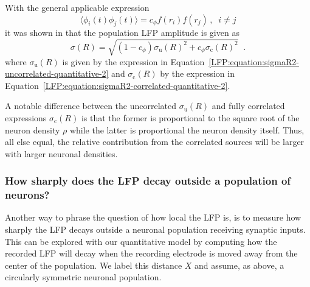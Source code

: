 With the general applicable expression
\begin{equation}
\langle \phi_i(t) \phi_j(t) \rangle= c_\phi f(r_i) f(r_j)\, , \;\; i \neq j
\label{LFP:box:equation:phii-phij}
\end{equation}
it was shown in \citet{Linden2011} that the population LFP amplitude is given as
\begin{equation}
  \sigma(R)=\sqrt{(1-c_\phi) \sigma_\text{u}(R)^2 +  c_\phi \sigma_\text{c}(R)^2}\;\;.
  \label{LFP:box:equation:sigmaR}
\end{equation}
where $\sigma_\text{u}(R)$ is given by the expression in Equation~\ref{LFP:equation:sigmaR2-uncorrelated-quantitative-2} and
 $\sigma_\text{c}(R)$ by the expression in Equation~\ref{LFP:equation:sigmaR2-correlated-quantitative-2}.

A notable difference between the uncorrelated $\sigma_\text{u}(R)$ and fully correlated expressions $\sigma_\text{c}(R)$ is that 
the former is proportional to the square root of the neuron density $\rho$ while the latter is proportional the neuron density itself.
Thus, all else equal, the relative contribution from the correlated sources will be larger with larger neuronal densities. 


\subsubsection{How sharply does the LFP decay outside a population of neurons?}

Another way to phrase the question of how local the LFP is, is to measure how sharply the LFP decays outside a neuronal population receiving synaptic inputs.
This can be explored with our quantitative model by computing how the recorded LFP will decay when the recording electrode is moved away from the center of 
the population. We label this distance $X$ and assume, as above, a circularly symmetric neuronal population. 

